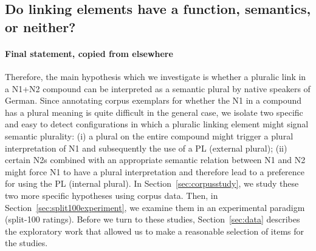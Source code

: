 \subsection{Do linking elements have a function, semantics, or neither?}
\label{sub:dolinkingelementshaveafunctionsemanticsorneither}


\paragraph{Final statement, copied from elsewhere}

Therefore, the main hypothesis which we investigate is whether a pluralic link in a N1+N2 compound can be interpreted as a semantic plural by native speakers of German.
Since annotating corpus exemplars for whether the N1 in a compound has a plural meaning is quite difficult in the general case, we isolate two specific and easy to detect configurations in which a pluralic linking element might signal semantic plurality:
(i) a plural on the entire compound might trigger a plural interpretation of N1 and subsequently the use of a PL (external plural);
(ii) certain N2s combined with an appropriate semantic relation between N1 and N2 might force N1 to have a plural interpretation and therefore lead to a preference for using the PL (internal plural).
In Section~\ref{sec:corpusstudy}, we study these two more specific hypotheses using corpus data.
Then, in Section~\ref{sec:split100experiment}, we examine them in an experimental paradigm (split-100 ratings).
Before we turn to these studies, Section~\ref{sec:data} describes the exploratory work that allowed us to make a reasonable selection of items for the studies.
